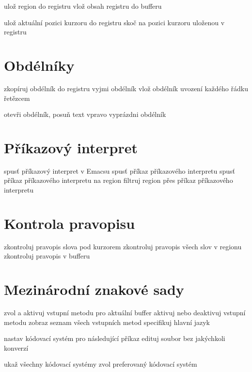  ulož region do registru
 vlož obsah registru do bufferu

 ulož aktuální pozici kurzoru do registru
 skoč na pozici kurzoru uloženou v registru

\section{Obdélníky}

 zkopíruj obdélník do registru
 vyjmi obdélník
 vlož obdélník
 uvození každého řádku řetězcem

 otevři obdélník, posuň text vpravo
 vyprázdni obdélník

\section{Příkazový interpret}

 spusť příkazový interpret v Emacsu
 spusť příkaz příkazového interpretu
 spusť příkaz příkazového interpretu na region
 filtruj region přes příkaz příkazového interpretu

\section{Kontrola pravopisu}

 zkontroluj pravopis slova pod kurzorem
 zkontroluj pravopis všech slov v regionu
 zkontroluj pravopis v bufferu

\section{Mezinárodní znakové sady}

 zvol a aktivuj vstupní metodu pro aktuální buffer
 aktivuj nebo deaktivuj vstupní metodu
 zobraz seznam všech vstupních metod
 specifikuj hlavní jazyk

 nastav kódovací systém pro následující příkaz
 edituj soubor bez jakýchkoli konverzí

 ukaž všechny kódovací systémy
 zvol preferovaný kódovací systém


